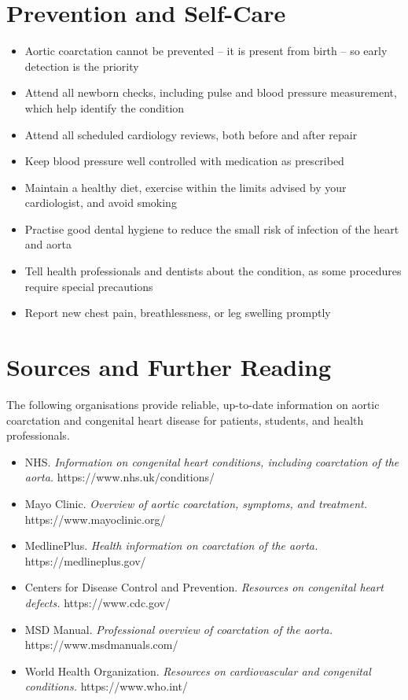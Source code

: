\section*{Prevention and Self-Care}
\begin{itemize}
    \item Aortic coarctation cannot be prevented -- it is present from birth -- so early detection is the priority
    \item Attend all newborn checks, including pulse and blood pressure measurement, which help identify the condition
    \item Attend all scheduled cardiology reviews, both before and after repair
    \item Keep blood pressure well controlled with medication as prescribed
    \item Maintain a healthy diet, exercise within the limits advised by your cardiologist, and avoid smoking
    \item Practise good dental hygiene to reduce the small risk of infection of the heart and aorta
    \item Tell health professionals and dentists about the condition, as some procedures require special precautions
    \item Report new chest pain, breathlessness, or leg swelling promptly
\end{itemize}

\section*{Sources and Further Reading}
The following organisations provide reliable, up-to-date information on aortic coarctation and congenital heart disease for patients, students, and health professionals.

\begin{itemize}
    \item NHS. \textit{Information on congenital heart conditions, including coarctation of the aorta.} https://www.nhs.uk/conditions/
    \item Mayo Clinic. \textit{Overview of aortic coarctation, symptoms, and treatment.} https://www.mayoclinic.org/
    \item MedlinePlus. \textit{Health information on coarctation of the aorta.} https://medlineplus.gov/
    \item Centers for Disease Control and Prevention. \textit{Resources on congenital heart defects.} https://www.cdc.gov/
    \item MSD Manual. \textit{Professional overview of coarctation of the aorta.} https://www.msdmanuals.com/
    \item World Health Organization. \textit{Resources on cardiovascular and congenital conditions.} https://www.who.int/
\end{itemize}
